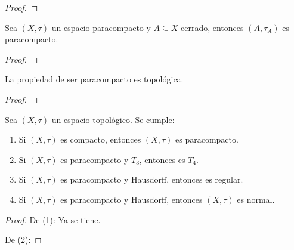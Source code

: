 \documentclass[12pt]{report}
\newcounter{it}
\theoremstyle{largebreak}
\begin{document}
    \begin{proof}
        
    \end{proof}

    \begin{propo}
        Sea $(X,\tau)$ un espacio paracompacto y $A\subseteq X$ cerrado, entonces $(A,\tau_A)$ es paracompacto.
    \end{propo}

    \begin{proof}
        
    \end{proof}

    \begin{propo}
        La propiedad de ser paracompacto es topológica.
    \end{propo}

    \begin{proof}
        
    \end{proof}

    \begin{propo}
        Sea $(X,\tau)$ un espacio topológico. Se cumple:
        \begin{enumerate}
            \item Si $(X,\tau)$ es compacto, entonces $(X,\tau)$ es paracompacto.
            \item Si $(X,\tau)$ es paracompacto y $T_3$, entonces es $T_4$.
            \item Si $(X,\tau)$ es paracompacto y Hausdorff, entonces es regular.
            \item Si $(X,\tau)$ es paracompacto y Hausdorff, entonces $(X,\tau)$ es normal.
        \end{enumerate}
    \end{propo}

    \begin{proof}
        
        De (1): Ya se tiene.
        
        De (2): 

    \end{proof}
\end{document}
